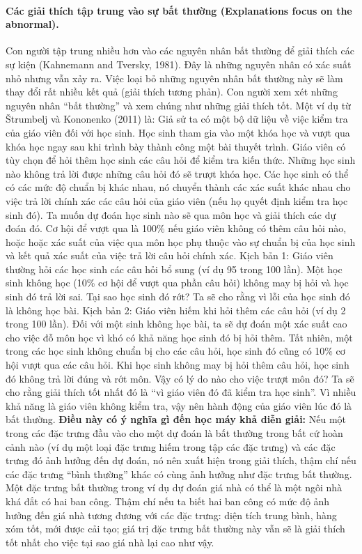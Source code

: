 \paragraph{Các giải thích tập trung vào sự bất thường (Explanations focus on the abnormal).} Con người tập trung nhiều hơn vào các nguyên nhân bất thường để giải thích các sự kiện (Kahnemann and Tversky, 1981). Đây là những nguyên nhân có xác suất nhỏ nhưng vẫn xảy ra. Việc loại bỏ những nguyên nhân bất thường này sẽ làm thay đổi rất nhiều kết quả (giải thích tương phản). Con người xem xét những nguyên nhân ``bất thường'' và xem chúng như những giải thích tốt. 
Một ví dụ từ Štrumbelj và Kononenko (2011) là: Giả sử ta có một bộ dữ liệu về việc kiểm tra của giáo viên đối với học sinh. Học sinh tham gia vào một khóa học và vượt qua khóa học ngay sau khi trình bày thành công một bài thuyết trình. Giáo viên có tùy chọn để hỏi thêm học sinh các câu hỏi để kiểm tra kiến thức. Những học sinh nào không trả lời được những câu hỏi đó sẽ trượt khóa học. Các học sinh có thể có các mức độ chuẩn bị khác nhau, nó chuyển thành các xác suất khác nhau cho việc trả lời chính xác các câu hỏi của giáo viên (nếu họ quyết định kiểm tra học sinh đó). Ta muốn dự đoán học sinh nào sẽ qua môn học và giải thích các dự đoán đó. Cơ hội để vượt qua là 100\% nếu giáo viên không có thêm câu hỏi nào, hoặc hoặc xác suất của việc qua môn học phụ thuộc vào sự chuẩn bị của học sinh và kết quả xác suất của việc trả lời câu hỏi chính xác.
Kịch bản 1: Giáo viên thường hỏi các học sinh các câu hỏi bổ sung (ví dụ 95 trong 100 lần). Một học sinh không học (10\% cơ hội để vượt qua phần câu hỏi) không may bị hỏi và học sinh đó trả lời sai. Tại sao học sinh đó rớt? Ta sẽ cho rằng vì lỗi của học sinh đó là không học bài.
Kịch bản 2: Giáo viên hiếm khi hỏi thêm các câu hỏi (ví dụ 2 trong 100 lần). Đối với một sinh không học bài, ta sẽ dự đoán một xác suất cao cho việc đỗ môn học vì khó có khả năng học sinh đó bị hỏi thêm. Tất nhiên, một trong các học sinh không chuẩn bị cho các câu hỏi, học sinh đó cũng có 10\% cơ hội vượt qua các câu hỏi. Khi học sinh không may bị hỏi thêm câu hỏi, học sinh đó không trả lời đúng và rớt môn. Vậy có lý do nào cho việc trượt môn đó? Ta sẽ cho rằng giải thích tốt nhất đó là ``vì giáo viên đó đã kiểm tra học sinh''. Vì nhiều khả năng là giáo viên không kiểm tra, vậy nên hành động của giáo viên lúc đó là bất thường.
\textbf{Điều này có ý nghĩa gì đến học máy khả diễn giải:} Nếu một trong các đặc trưng đầu vào cho một dự đoán là bất thường trong bất cứ hoàn cảnh nào (ví dụ một loại đặc trưng hiếm trong tập các đặc trưng) và các đặc trưng đó ảnh hưởng đến dự đoán, nó nên xuất hiện trong giải thích, thậm chí nếu các đặc trưng ``bình thường'' khác có cùng ảnh hưởng như đặc trưng bất thường. Một đặc trưng bất thường trong ví dụ dự đoán giá nhà có thể là một ngôi nhà khá đắt có hai ban công. Thậm chí nếu ta biết hai ban công có mức độ ảnh hưởng đến giá nhà tương đương với các đặc trưng: diện tích trung bình, hàng xóm tốt, mới được cải tạo; giá trị đặc trưng bất thường này vẫn sẽ là giải thích tốt nhất cho việc tại sao giá nhà lại cao như vậy.

